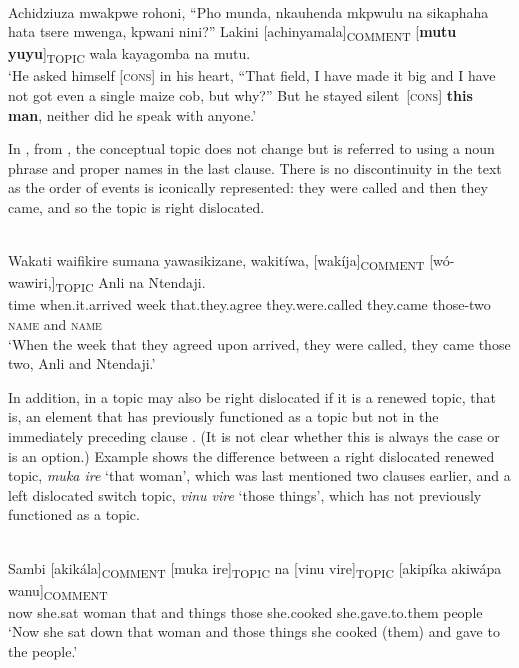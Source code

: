 \documentclass[output=paper]{langsci/langscibook}
\begin{document}
\ea\label{ex:11.nicolle}
\\
  Achidziuza mwakpwe rohoni, “Pho munda, nkauhenda mkpwulu na sikaphaha hata tsere mwenga, kpwani nini?” Lakini [achinyamala]\textsubscript{COMMENT} [\textbf{mutu yuyu}]\textsubscript{TOPIC} wala kayagomba na mutu.\\ 
\glt ‘He asked himself [\textsc{cons}] in his heart, “That field, I have made it big and I have not got even a single maize cob, but why?” But he stayed silent~[\textsc{cons}] \textbf{this man}, neither did he speak with anyone.’
\z

In , from , the conceptual topic does not change but is referred to using a noun phrase and proper names in the last clause. There is no discontinuity in the text as the order of events is iconically represented: they were called and then they came, and so the topic is right dislocated.

\ea\label{ex:12.nicolle}
\\
\gll Wakati waifikire sumana yawasikizane, wakitíwa, [wakíja]\textsubscript{COMMENT} [wó-wawiri,]\textsubscript{TOPIC} Anli na Ntendaji.\\
time when.it.arrived week that.they.agree they.were.called {\db}they.came {\db}those-two \textsc{name} and \textsc{name}\\
\glt ‘When the week that they agreed upon arrived, they were called, they came those two, Anli and Ntendaji.’
\z

In addition, in  a topic may also be right dislocated if it is a renewed topic, that is, an element that has previously functioned as a topic but not in the immediately preceding clause \citep[10-11]{floor2005}. (It is not clear whether this is always the case or is an option.) Example  shows the difference between a right dislocated renewed topic, \textit{muk}\textit{a ire} ‘that woman’, which was last mentioned two clauses earlier, and a left dislocated switch topic, \textit{vinu vire} ‘those things’, which has not previously functioned as a topic.

\ea\label{ex:13.nicolle}
\\
\gll Sambi [akikála]\textsubscript{COMMENT} [muka ire]\textsubscript{TOPIC} na [vinu vire]\textsubscript{TOPIC} [akipíka akiwápa wanu]\textsubscript{COMMENT}\\
now {\db}she.sat {\db}woman that and {\db}things those {\db}she.cooked she.gave.to.them people\\
\glt ‘Now she sat down that woman and those things she cooked (them) and gave to the people.’
\z
\end{document}
